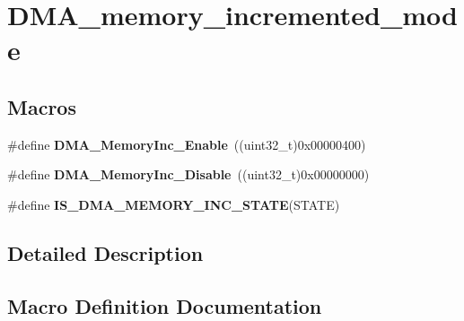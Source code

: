 \hypertarget{group___d_m_a__memory__incremented__mode}{}\section{D\+M\+A\+\_\+memory\+\_\+incremented\+\_\+mode}
\label{group___d_m_a__memory__incremented__mode}
\subsection*{Macros}
\begin{DoxyCompactItemize}
\item 
\hypertarget{group___d_m_a__memory__incremented__mode_ga4e8cb23d039c74bbbf365d7678835bbb}{}\#define {\bfseries D\+M\+A\+\_\+\+Memory\+Inc\+\_\+\+Enable}~((uint32\+\_\+t)0x00000400)\label{group___d_m_a__memory__incremented__mode_ga4e8cb23d039c74bbbf365d7678835bbb}

\item 
\hypertarget{group___d_m_a__memory__incremented__mode_ga795a277c997048783a383b026f19a5ab}{}\#define {\bfseries D\+M\+A\+\_\+\+Memory\+Inc\+\_\+\+Disable}~((uint32\+\_\+t)0x00000000)\label{group___d_m_a__memory__incremented__mode_ga795a277c997048783a383b026f19a5ab}

\item 
\#define {\bfseries I\+S\+\_\+\+D\+M\+A\+\_\+\+M\+E\+M\+O\+R\+Y\+\_\+\+I\+N\+C\+\_\+\+S\+T\+A\+T\+E}(S\+T\+A\+T\+E)
\end{DoxyCompactItemize}


\subsection{Detailed Description}


\subsection{Macro Definition Documentation}
\hypertarget{group___d_m_a__memory__incremented__mode_gaa880f39d499d1e80449cf80381e4eb67}{}
